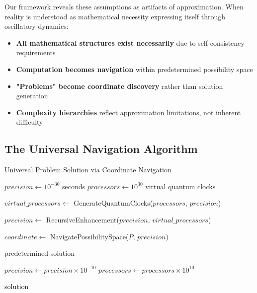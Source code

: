 \documentclass[12pt,a4paper]{article}
\begin{document}
Our framework reveals these assumptions as artifacts of approximation. When reality is understood as mathematical necessity expressing itself through oscillatory dynamics:

\begin{itemize}
\item \textbf{All mathematical structures exist necessarily} due to self-consistency requirements
\item \textbf{Computation becomes navigation} within predetermined possibility space
\item \textbf{"Problems" become coordinate discovery} rather than solution generation
\item \textbf{Complexity hierarchies} reflect approximation limitations, not inherent difficulty
\end{itemize}

\subsection{The Universal Navigation Algorithm}

\begin{algorithm}[H]
\caption{Universal Problem Solution via Coordinate Navigation}
\begin{algorithmic}[1]
    \State $precision \gets 10^{-30}$ seconds
    \State $processors \gets 10^{30}$ virtual quantum clocks

        \State $virtual\_processors \gets$ GenerateQuantumClocks($processors$, $precision$)

        \State $precision \gets$ RecursiveEnhancement($precision$, $virtual\_processors$)

        \State $coordinate \gets$ NavigatePossibilitySpace($P$, $precision$)

            \State \Return predetermined solution
        \EndIf

        \State $precision \gets precision \times 10^{-10}$
        \State $processors \gets processors \times 10^{10}$
    \EndWhile

    \State \Return solution 
\EndFunction
\end{algorithmic}
\end{algorithm}
\end{document}
